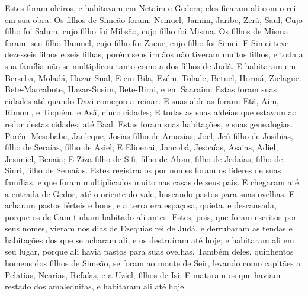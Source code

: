 {  Estes foram oleiros, e habitavam em Netaim e Gedera; eles ficaram ali com o rei em sua obra.
  Os filhos de Simeão foram: Nemuel, Jamim, Jaribe, Zerá, Saul;
  Cujo filho foi Salum, cujo filho foi Mibsão, cujo filho foi Misma. %
  Os filhos de Misma foram: seu filho Hamuel, cujo filho foi Zacur, cujo filho foi Simei.
  E Simei teve dezesseis filhos e seis filhas, porém seus irmãos não tiveram muitos filhos, e toda a sua família não se multiplicou tanto como a dos filhos de Judá.
  E habitaram em Berseba, Moladá, Hazar-Sual,
  E em Bila, Ezém, Tolade,
  Betuel, Hormá, Ziclague.
  Bete-Marcabote, Hazar-Susim, Bete-Birai, e em Saaraim. Estas foram suas cidades até quando Davi começou a reinar.
  E suas aldeias foram: Etã, Aim, Rimom, e Toquém, e Asã, cinco cidades;
  E todas as suas aldeias que estavam ao redor destas cidades, até Baal. Estas foram suas habitações, e suas genealogias.
  Porém Mesobabe, Janleque, Josias filho de Amazias;
  Joel, Jeú filho de Josibias, filho de Seraías, filho de Asiel;
  E Elioenai, Jaacobá, Jesoaías, Asaias, Adiel, Jesimiel, Benaia;
  E Ziza filho de Sifi, filho de Alom, filho de Jedaías, filho de Sinri, filho de Semaías.
  Estes registrados por
{} nomes foram os líderes
 de suas famílias, e que foram multiplicados muito nas casas de seus pais.
  E chegaram até a entrada de Gedor, até o oriente do vale, buscando pastos para suas ovelhas.
  E acharam pastos férteis e bons, e a terra era espaçosa, quieta, e descansada, porque os de Cam tinham habitado ali antes.
  Estes, pois, que foram escritos por seus nomes, vieram nos dias de Ezequias rei de Judá, e derrubaram as tendas e habitações dos que se acharam ali, e os destruíram até hoje; e habitaram ali em seu lugar, porque ali havia pastos para suas ovelhas.
  Também
{} deles, quinhentos homens dos filhos de Simeão, se foram ao monte de Seir, levando como capitães a Pelatias, Nearias, Refaías, e a Uziel, filhos de Isi;
  E mataram os que haviam restado dos amalequitas, e habitaram ali até hoje.
\par }

